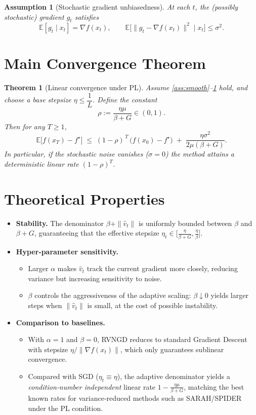 \documentclass{article}
\newtheorem{theorem}{Theorem}[section]
\newtheorem{assumption}{Assumption}[section]
\begin{document}
\begin{assumption}[Stochastic gradient unbiasedness]\label{ass:unbiased}
At each $t$, the (possibly stochastic) gradient $g_t$ satisfies
\[
\mathbb{E}[g_t\mid x_t]=\nabla f(x_t),\qquad 
\mathbb{E}\!\big[\|g_t-\nabla f(x_t)\|^2\mid x_t\big]\le\sigma^2 .
\]
\end{assumption}

\section*{Main Convergence Theorem}
\begin{theorem}[Linear convergence under PL]\label{thm:linear}
Assume \ref{ass:smooth}–\ref{ass:unbiased} hold, and choose a base stepsize 
$\eta\le \dfrac{1}{L}$.  
Define the constant
\[
\rho:=\frac{\eta\mu}{\beta+G}\in(0,1).
\]
Then for any $T\ge1$,
\[
\mathbb{E}\big[f(x_T)-f^\star\big]\;\le\;
(1-\rho)^{\,T}\,\big(f(x_0)-f^\star\big)
\;+\;
\frac{\eta\sigma^2}{2\mu(\beta+G)} .
\]
In particular, if the stochastic noise vanishes ($\sigma=0$) the method attains a
deterministic linear rate $(1-\rho)^T$.
\end{theorem}

\section*{Theoretical Properties}
\begin{itemize}
    \item \textbf{Stability.} The denominator $\beta+\|\hat v_t\|$ is uniformly bounded 
          between $\beta$ and $\beta+G$, guaranteeing that the effective stepsize
          $\eta_t\in\big[\frac{\eta}{\beta+G},\frac{\eta}{\beta}\big]$.
    \item \textbf{Hyper‑parameter sensitivity.}
          \begin{itemize}
              \item Larger $\alpha$ makes $\hat v_t$ track the current gradient more closely,
                    reducing variance but increasing sensitivity to noise.
              \item $\beta$ controls the aggressiveness of the adaptive scaling:
                    $\beta\downarrow0$ yields larger steps when $\|\hat v_t\|$ is small,
                    at the cost of possible instability.
          \end{itemize}
    \item \textbf{Comparison to baselines.}
          \begin{itemize}
              \item With $\alpha=1$ and $\beta=0$, RVNGD reduces to standard Gradient Descent
                    with stepsize $\eta/\|\nabla f(x_t)\|$, which only guarantees sublinear convergence.
              \item Compared with SGD ($\eta_t\equiv\eta$), the adaptive denominator
                    yields a \emph{condition‑number independent} linear rate
                    $1-\frac{\eta\mu}{\beta+G}$, matching the best known rates for
                    variance‑reduced methods such as SARAH/SPIDER under the PL condition.
          \end{itemize}
\end{itemize}
\end{document}
